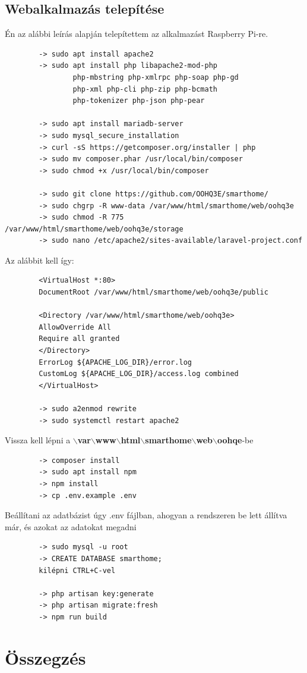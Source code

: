 \documentclass[
]{thesis-ekf}
\theoremstyle{definition}
\theoremstyle{remark}
\begin{document}
	\section{Webalkalmazás telepítése}
	Én az alábbi leírás alapján telepítettem az alkalmazást Raspberry Pi-re.
	\begin{verbatim}
		-> sudo apt install apache2
		-> sudo apt install php libapache2-mod-php 
				php-mbstring php-xmlrpc php-soap php-gd 
				php-xml php-cli php-zip php-bcmath 
				php-tokenizer php-json php-pear
				
		-> sudo apt install mariadb-server
		-> sudo mysql_secure_installation
		-> curl -sS https://getcomposer.org/installer | php
		-> sudo mv composer.phar /usr/local/bin/composer
		-> sudo chmod +x /usr/local/bin/composer
		
		-> sudo git clone https://github.com/OOHQ3E/smarthome/
		-> sudo chgrp -R www-data /var/www/html/smarthome/web/oohq3e
		-> sudo chmod -R 775 /var/www/html/smarthome/web/oohq3e/storage
		-> sudo nano /etc/apache2/sites-available/laravel-project.conf
	\end{verbatim} 
	Az alábbit kell így:
	\begin{verbatim}
		<VirtualHost *:80>
		DocumentRoot /var/www/html/smarthome/web/oohq3e/public
		
		<Directory /var/www/html/smarthome/web/oohq3e>
		AllowOverride All
		Require all granted
		</Directory>
		ErrorLog ${APACHE_LOG_DIR}/error.log
		CustomLog ${APACHE_LOG_DIR}/access.log combined
		</VirtualHost>
		
		-> sudo a2enmod rewrite
		-> sudo systemctl restart apache2
	\end{verbatim}
	Vissza kell lépni a \textbf{$\backslash$var$\backslash$www$\backslash$html$\backslash$smarthome$\backslash$web$\backslash$oohqe}-be
	\begin{verbatim}
		-> composer install
		-> sudo apt install npm
		-> npm install
		-> cp .env.example .env
	\end{verbatim}
		Beállítani az adatbázist úgy .env fájlban, ahogyan a rendszeren be lett állítva már, és azokat az adatokat megadni
	\begin{verbatim}
		-> sudo mysql -u root
		-> CREATE DATABASE smarthome;
		kilépni CTRL+C-vel
		
		-> php artisan key:generate
		-> php artisan migrate:fresh
		-> npm run build
	\end{verbatim}\cite{install-laravel-on-ubuntu}
	\chapter*{Összegzés}
	
\end{document}
